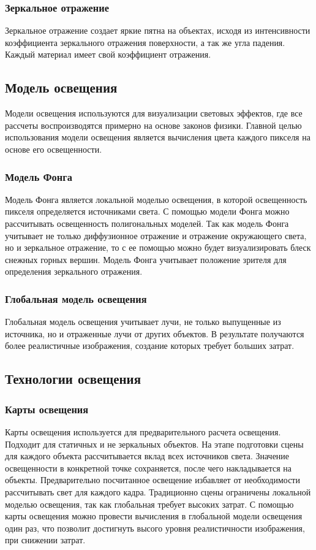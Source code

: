 \subsubsection{Зеркальное отражение}
Зеркальное отражение создает яркие пятна на объектах, исходя из интенсивности коэффициента зеркального отражения поверхности, а так же угла падения.
Каждый материал имеет свой коэффициент отражения.

\subsection{Модель освещения}
Модели освещения используются для визуализации световых эффектов, где все рассчеты воспроизводятся примерно на основе законов физики. Главной целью использования модели освещения является вычисления цвета каждого пикселя на основе его освещенности.

\subsubsection{Модель Фонга}
Модель Фонга является локальной моделью освещения, в которой освещенность пикселя определяется источниками света.
С помощью модели Фонга можно рассчитывать освещенность полигональных моделей.
Так как модель Фонга учитывает не только диффузионное отражение и отражение окружающего света, но и зеркальное отражение, то с ее помощью можно будет визуализировать блеск снежных горных вершин.
Модель Фонга учитывает положение зрителя для определения зеркального отражения.

\subsubsection{Глобальная модель освещения}
Глобальная модель освещения учитывает лучи, не только выпущенные из источника, но и отраженные лучи от других объектов. В результате получаются более реалистичные изображения, создание которых требует больших затрат.

\subsection{Технологии освещения}
\subsubsection{Карты освещения}
Карты освещения используется для предварительного расчета освещения. Подходит для статичных и не зеркальных объектов. На этапе подготовки сцены для каждого объекта рассчитывается вклад всех источников света. Значение освещенности в конкретной точке сохраняется, после чего накладывается на объекты. Предварительно посчитанное освещение избавляет от необходимости рассчитывать свет для каждого кадра.
Традиционно сцены ограничены локальной моделью освещения, так как глобальная требует высоких затрат. С помощью карты освещения можно провести вычисления в глобальной модели освещения один раз, что позволит достигнуть высого уровня реалистичности изображения, при снижении затрат.




